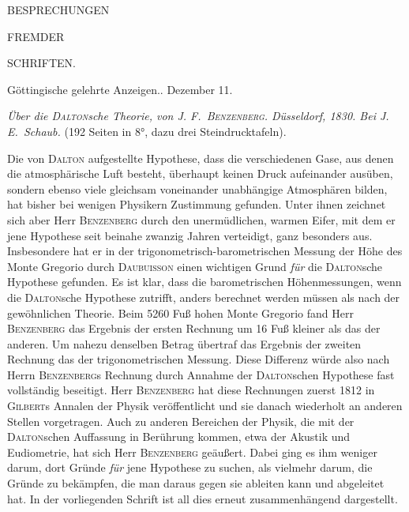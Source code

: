 \clearpage
{}
\thispagestyle{empty}
\vspace*{35mm}
\begin{center}
{\LARGE BESPRECHUNGEN}\par\vspace{16mm}
{\large FREMDER}\par\vspace{16mm}
{\LARGE SCHRIFTEN.}
\end{center}
\clearpage
{}
\begin{center}\small Göttingische gelehrte Anzeigen.. Dezember 11.\end{center}

\textit{Über die \textup{\textsc{Dalton}}sche Theorie, von \textup{J. F.\ \textsc{Benzenberg}.} Düsseldorf, \textup{1830.} Bei J. E.\ Schaub.} (192 Seiten in 8°, dazu drei Steindrucktafeln).

Die von \textsc{Dalton} aufgestellte Hypothese, dass die verschiedenen Gase, aus denen die atmosphärische Luft besteht, überhaupt keinen Druck aufeinander ausüben, sondern ebenso viele gleichsam voneinander unabhängige Atmosphären bilden, hat bisher bei wenigen Physikern Zustimmung gefunden. Unter ihnen zeichnet sich aber Herr \textsc{Benzenberg} durch den unermüdlichen, warmen Eifer, mit dem er jene Hypothese seit beinahe zwanzig Jahren verteidigt, ganz besonders aus. Insbesondere hat er in der trigonometrisch-barometrischen Messung der Höhe des Monte Gregorio durch \textsc{Daubuisson} einen wichtigen Grund \textit{für} die \textsc{Dalton}sche Hypothese gefunden. Es ist klar, dass die barometrischen Höhenmessungen, wenn die \textsc{Dalton}sche Hypothese zutrifft, anders berechnet werden müssen als nach der gewöhnlichen Theorie. Beim 5260 Fuß hohen Monte Gregorio fand Herr \textsc{Benzenberg} das Ergebnis der ersten Rechnung um 16 Fuß kleiner als das der anderen. Um nahezu denselben Betrag übertraf das Ergebnis der zweiten Rechnung das der trigonometrischen Messung. Diese Differenz würde also nach Herrn \textsc{Benzenberg}s Rechnung durch Annahme der \textsc{Dalton}schen Hypothese fast vollständig beseitigt. Herr \textsc{Benzenberg} hat diese Rechnungen zuerst 1812 in \textsc{Gilbert}s Annalen der Physik veröffentlicht und sie danach
wiederholt an anderen Stellen vorgetragen. Auch zu anderen Bereichen der Physik, die mit der \textsc{Dalton}schen Auffassung in Berührung kommen, etwa der Akustik und Eudiometrie, hat sich Herr \textsc{Benzenberg} geäußert. Dabei ging es ihm weniger darum, dort Gründe \textit{für} jene Hypothese zu suchen, als vielmehr darum, die Gründe zu bekämpfen, die man daraus gegen sie ableiten kann und abgeleitet hat. In der vorliegenden Schrift ist all dies erneut zusammenhängend dargestellt.

